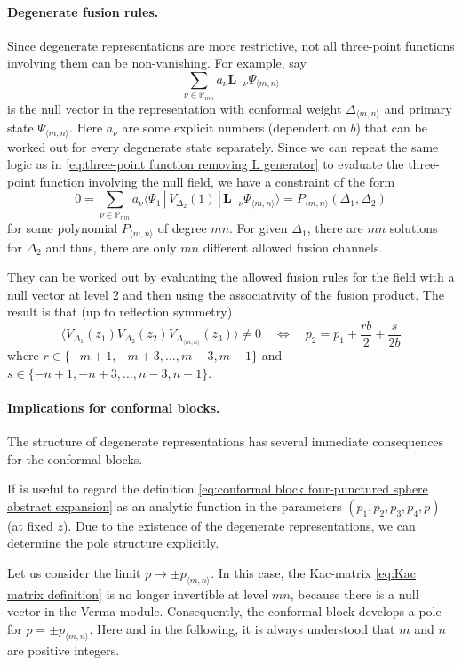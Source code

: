 \documentclass[12pt,a4paper]{article}
\newcommand{\be}{\begin{equation}}
\newcommand{\ee}{\end{equation}}
\newcommand\PP{\mathbb{P}}
\begin{document}
\paragraph{Degenerate fusion rules.} Since degenerate representations are more restrictive, not all three-point functions involving them can be non-vanishing.
For example, say
\be 
\sum_{\nu \in \PP_{mn}} a_\nu \mathbf{L}_{-\nu} \Psi_{\langle m,n \rangle}
\ee
is the null vector in the representation with conformal weight $\Delta_{\langle m,n \rangle}$ and primary state $\Psi_{\langle m,n \rangle}$. Here $a_\nu$ are some explicit numbers (dependent on $b$) that can be worked out for every degenerate state separately. Since we can repeat the same logic as in \eqref{eq:three-point function removing L generator} to evaluate the three-point function involving the null field, we have a constraint of the form
\be 
0=\sum_{\nu \in \PP_{mn}} a_\nu \langle \Psi_1\, |\,  V_{\Delta_2}(1)\, |\, \mathbf{L}_{-\nu} \Psi_{\langle m,n\rangle} \rangle=P_{\langle m,n \rangle}(\Delta_1,\Delta_2)
\ee
for some polynomial $P_{\langle m,n \rangle}$ of degree $mn$. For given $\Delta_1$, there are $mn$ solutions for $\Delta_2$ and thus, there are only $mn$ different allowed fusion channels. 

They can be worked out by evaluating the allowed fusion rules for the field with a null vector at level 2 and then using the associativity of the fusion product. The result is that (up to reflection symmetry)
\be 
\langle  V_{\Delta_1}(z_1)V_{\Delta_2}(z_2) V_{\Delta_{\langle m,n \rangle}}(z_3) \rangle \ne 0 \quad \Longleftrightarrow\quad p_2=p_1 + \frac{rb}{2}+\frac{s}{2b} \label{eq:degenerate fusion rules}
\ee
where $r \in \{-m+1,-m+3,\dots,m-3,m-1\}$ and $s \in \{-n+1,-n+3,\dots,n-3,n-1\}$.

\paragraph{Implications for conformal blocks.} The structure of degenerate representations has several immediate consequences for the conformal blocks.

If is useful to regard the definition \eqref{eq:conformal block four-punctured sphere abstract expansion} as an analytic function in the parameters $(p_1,p_2,p_3,p_4,p)$ (at fixed $z$). Due to the existence of the degenerate representations, we can determine the pole structure explicitly.

Let us consider the limit $p \to \pm p_{\langle m,n \rangle}$. In this case, the Kac-matrix \eqref{eq:Kac matrix definition} is no longer invertible at level $mn$, because there is a null vector in the Verma module. Consequently, the conformal block develops a pole for $p=\pm p_{\langle m,n \rangle}$.
Here and in the following, it is always understood that $m$ and $n$ are positive integers.
\end{document}
